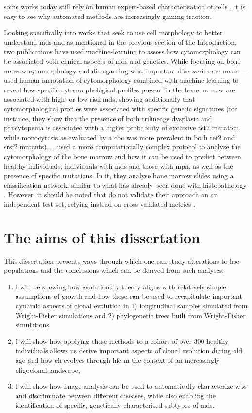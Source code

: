 some works today still rely on human expert-based characterisation of cells \cite{Nagata2020-lh}, it is easy to see why automated methods are increasingly gaining traction.

Looking specifically into works that seek to use cell morphology to better understand \ac{mds} and as mentioned in the previous section of the Introduction, two publications have used machine-learning to assess how cytomorphology can be associated with clinical aspects of \ac{mds} and genetics. While focusing on bone marrow cytomorphology and disregarding \ac{wbs}, important discoveries are made ---  used human annotation of cytomorphology combined with machine-learning to reveal how specific cytomorphological profiles present in the bone marrow are associated with high- or low-risk \ac{mds}, showing additionally that cytomorphological profiles were associated with specific genetic signatures (for instance, they show that the presence of both trilineage dysplasia and pancytopenia is associated with a higher probability of exclusive \ac{tet2} mutation, while monocytosis as evaluated by a \ac{cbc} was more prevalent in both \ac{tet2} and \ac{srsf2} mutants) \cite{Nagata2020-lh}. , used a more computationally complex protocol to analyse the cytomorphology of the bone marrow and how it can be used to predict between healthy individuals, individuals with \ac{mds} and those with \ac{mpn}, as well as the presence of specific mutations. In it, they analyse bone marrow slides using a classification network, similar to what has already been done with histopathology \cite{Fu2020-mx}. However, it should be noted that  do not validate their approach on an independent test set, relying instead on cross-validated metrics \cite{Bruck2021-fx}. 

\section{The aims of this dissertation}

This dissertation presents ways through which one can study alterations to \ac{hsc} populations and the conclusions which can be derived from such analyses:

\begin{enumerate}
	\item I will be showing how evolutionary theory aligns with relatively simple assumptions of growth and how these can be used to recapitulate important dynamic aspects of clonal evolution in 1) longitudinal samples simulated from Wright-Fisher simulations and 2) phylogenetic trees built from Wright-Fisher simulations;
	\item I will show how applying these methods to a cohort of over 300 healthy individuals allows us derive important aspects of clonal evolution during old age and how \ac{ch} evolves through life in the context of an increasingly oligoclonal landscape;
	\item I will show how image analysis can be used to automatically characterize \ac{wbs} and discriminate between different diseases, while also enabling the identification of specific, genetically-characterised subtypes of \ac{mds}.
\end{enumerate}
